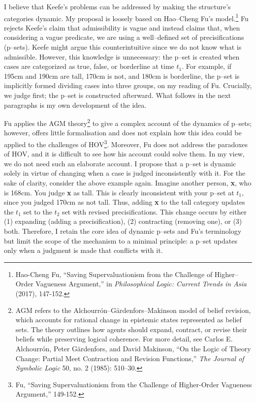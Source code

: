 I believe that Keefe's problems can be addressed by making the
structure's categories dynamic. My proposal is loosely based on
Hao--Cheng Fu's model.\footnote{Hao-Cheng Fu, ``Saving Supervaluationism
  from the Challenge of Higher--Order Vagueness Argument,'' in
  \emph{Philosophical Logic: Current Trends in Asia} (2017), 147-152.} Fu rejects Keefe's
claim that admissibility is vague and instead claims that, when
considering a vague predicate, we are using a well--defined set of
precisifications (p--sets). Keefe might argue this counterintuitive since
we do not know what is admissible. However, this knowledge is
unnecessary: the p--set is created when cases are categorized as true,
false, or borderline at time \(t_{1}\). For example, if 195cm and 190cm
are tall, 170cm is not, and 180cm is borderline, the p--set is implicitly
formed dividing cases into three groups, on my reading of Fu. Crucially,
we judge first; the p--set is constructed afterward. What follows in the
next paragraphs is my own development of the idea.

Fu applies the AGM theory\footnote{AGM refers to the
  Alchourrón--Gärdenfors--Makinson model of belief revision, which
  accounts for rational change in epistemic states represented as belief
  sets. The theory outlines how agents should expand, contract, or
  revise their beliefs while preserving logical coherence. For more
  detail, see Carlos E. Alchourrón, Peter Gärdenfors, and David
  Makinson, ``On the Logic of Theory Change: Partial Meet Contraction
  and Revision Functions,'' \emph{The Journal of Symbolic Logic} 50, no.
  2 (1985): 510--30.}
to give a complex account of the dynamics of p--sets; however, offers
little formalisation and does not explain how this idea could be applied
to the challenges of HOV\footnote{Fu, ``Saving Supervaluationism from
  the Challenge of Higher-Order Vagueness Argument,'' 149-152.}.
Moreover, Fu does not address the paradoxes of HOV, and it is difficult
to see how his account could solve them. In my view, we do not need such
an elaborate account. I propose that a p--set is dynamic solely in virtue
of changing when a case is judged inconsistently with it. For the sake
of clarity, consider the above example again. Imagine another person,
\textbf{x}, who is 168cm. You judge \textbf{x} as tall. This is clearly
inconsistent with your p--set at \(t_{1}\), since you judged 170cm as not
tall. Thus, adding \textbf{x} to the tall category updates the \(t_{1}\)
set to the \(t_{2}\) set with revised precisifications. This change
occurs by either (1) expanding (adding a precisification), (2)
contracting (removing one), or (3) both. Therefore, I retain the core
idea of dynamic p--sets and Fu's terminology but limit the scope of the
mechanism to a minimal principle: a p--set updates only when a judgment
is made that conflicts with it.

